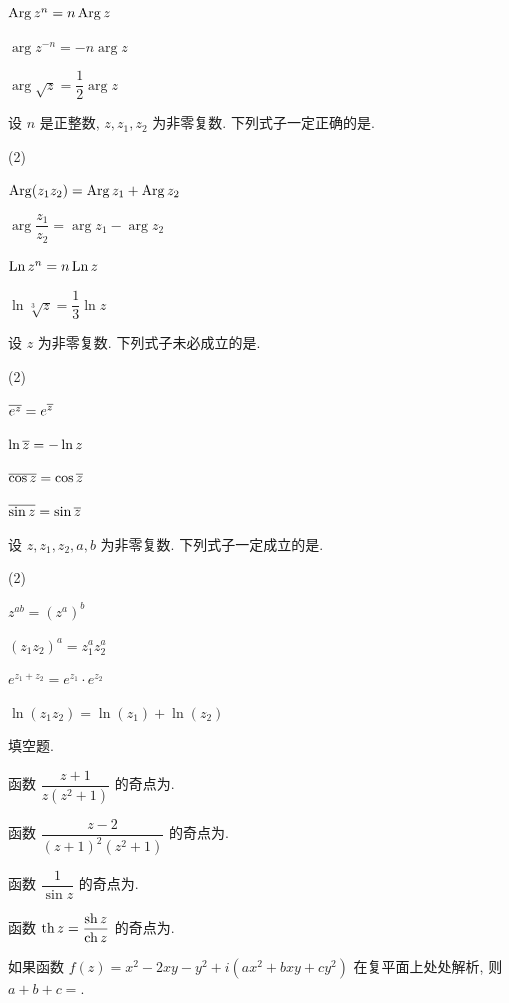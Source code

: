 \begin{homework}
\begin{subex}
\begin{exchoice}
      \item $\operatorname{Arg} z^n=n\operatorname{Arg} z$
      \item $\arg z^{-n}=-n\arg z$
      \item $\arg \sqrt z=\dfrac12\arg z$
    \end{exchoice}
    \item 设 $n$ 是正整数, $z,z_1,z_2$ 为非零复数. 下列式子一定正确的是\fillbrace{}.
    \begin{exchoice}(2)
      \item $\operatorname{Arg}(z_1z_2)=\operatorname{Arg} z_1+\operatorname{Arg} z_2$
      \item $\arg\dfrac{z_1}{z_2}=\arg z_1-\arg z_2$
      \item $\operatorname{Ln} z^n=n\operatorname{Ln} z$
      \item $\ln\sqrt[3]z=\dfrac13\ln z$
    \end{exchoice}
    \item 设 $z$ 为非零复数. 下列式子未必成立的是\fillbrace{}.
    \begin{exchoice}(2)
      \item $\overline{e^z}=e^{\overline z}$
      \item $\ln\overline{z}=-\ln z$
      \item $\overline{\cos z}=\cos{\overline z}$
      \item $\overline{\sin z}=\sin{\overline z}$
    \end{exchoice}
    \item 设 $z,z_1,z_2,a,b$ 为非零复数. 下列式子一定成立的是\fillbrace{}.
    \begin{exchoice}(2)
      \item $z^{ab}=(z^a)^b$
      \item $(z_1z_2)^a=z_1^az_2^a$
      \item $e^{z_1+z_2}=e^{z_1}\cdot e^{z_2}$
      \item $\ln(z_1z_2)=\ln(z_1)+\ln(z_2)$
    \end{exchoice}
  \end{subex}
  \item 填空题.
  \begin{subex}
    \item 函数 $\dfrac{z+1}{z(z^2+1)}$ 的奇点为\fillblank{}.
    \item 函数 $\dfrac{z-2}{(z+1)^2(z^2+1)}$ 的奇点为\fillblank{}.
    \item 函数 $\dfrac{1}{\sin z}$ 的奇点为\fillblank{}.
    \item 函数 $\operatorname{th} z=\dfrac{\operatorname{sh} z}{\operatorname{ch} z}$ 的奇点为\fillblank{}.
    \item 如果函数 $f(z)=x^2-2xy-y^2+i(ax^2+bxy+cy^2)$ 在复平面上处处解析, 则 $a+b+c=$\fillblank{}.

\end{subex}
\end{homework}
